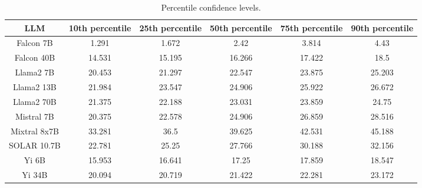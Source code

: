 \begin{table*}
\centering
\begin{tabular}{c|c|c|c|c|c}
LLM & 10th percentile & 25th percentile & 50th percentile & 75th percentile & 90th percentile\\ \hline
Falcon 7B & 1.291 & 1.672 & 2.42 & 3.814 & 4.43\\
Falcon 40B & 14.531 & 15.195 & 16.266 & 17.422 & 18.5\\
Llama2 7B & 20.453 & 21.297 & 22.547 & 23.875 & 25.203\\
Llama2 13B & 21.984 & 23.547 & 24.906 & 25.922 & 26.672\\
Llama2 70B & 21.375 & 22.188 & 23.031 & 23.859 & 24.75\\
Mistral 7B & 20.375 & 22.578 & 24.906 & 26.859 & 28.516\\
Mixtral 8x7B & 33.281 & 36.5 & 39.625 & 42.531 & 45.188\\
SOLAR 10.7B & 22.781 & 25.25 & 27.766 & 30.188 & 32.156\\
Yi 6B & 15.953 & 16.641 & 17.25 & 17.859 & 18.547\\
Yi 34B & 20.094 & 20.719 & 21.422 & 22.281 & 23.172\\
\hline
\end{tabular}
\caption{Percentile confidence levels.}
\label{tab:percentile_conf}
\end{table*}
